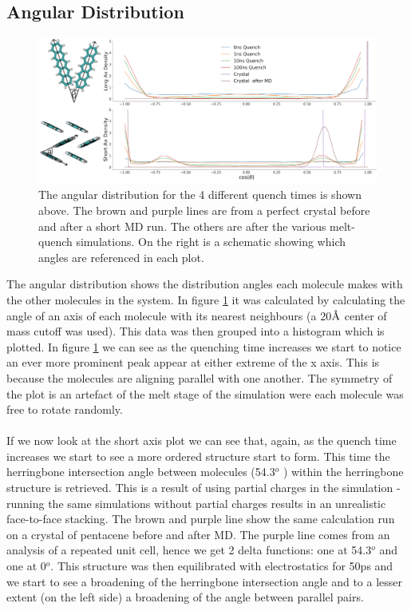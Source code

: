 \subsection{Angular Distribution}
\label{sect:ang_dist}
\begin{figure}[ht]
	\includegraphics[width=\textwidth]{./img/DifferentQuenchTimes/AngularDist.png}
	\caption{\label{fig:ang_dist}
\noindent The angular distribution for the 4 different quench times is shown above. The brown and purple lines are from a perfect crystal before and after a short MD run. The others are after the various melt-quench simulations. On the right is a schematic showing which angles are referenced in each plot.}
\end{figure}
\noindent The angular distribution shows the distribution angles each molecule makes with the other molecules in the system. In figure \ref{fig:ang_dist} it was calculated by calculating the angle of an axis of each molecule with its nearest neighbours (a 20$\text{\normalfont\AA}$ center of mass cutoff was used). This data was then grouped into a histogram which is plotted.
In figure \ref{fig:ang_dist} we can see as the quenching time increases we start to notice an ever more prominent peak appear at either extreme of the x axis. This is because the molecules are aligning parallel with one another. The symmetry of the plot is an artefact of the melt stage of the simulation were each molecule was free to rotate randomly.
\\\\
If we now look at the short axis plot we can see that, again, as the quench time increases we start to see a more ordered structure start to form. This time the herringbone intersection angle between molecules (54.3$^{o}$ \cite{PentaceneAngle}) within the herringbone structure is retrieved. This is a result of using partial charges in the simulation -running the same simulations without partial charges results in an unrealistic face-to-face stacking. The brown and purple line show the same calculation run on a crystal of pentacene before and after MD. The purple line comes from an analysis of a repeated unit cell, hence we get 2 delta functions: one at 54.3$^{o}$ and one at 0$^{o}$. This structure was then equilibrated with electrostatics for 50ps and we start to see a broadening of the herringbone intersection angle and to a lesser extent (on the left side) a broadening of the angle between parallel pairs.
